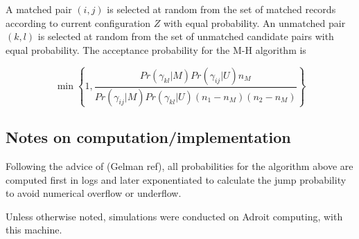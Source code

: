 \documentclass[11pt,reqno]{amsart}
\begin{document}
A matched pair $(i,j)$ is selected at random from the set of matched records according to current configuration $Z$ with equal probability.  An unmatched pair $(k,l)$ is selected at random from the set of unmatched candidate pairs with equal probability.   The acceptance probability for the M-H algorithm is

\[ \min \left\{1,  \frac{Pr(\gamma_{kl} | M)Pr(\gamma_{ij} | U) n_M}{Pr(\gamma_{ij} | M) Pr(\gamma_{kl} | U) (n_1 - n_M)(n_2 - n_M)} \right\} \]

\subsection{Notes on computation/implementation}

Following the advice of (Gelman ref), all probabilities for the algorithm above are computed first in logs and later exponentiated to calculate the jump probability to avoid numerical overflow or underflow. 

Unless otherwise noted, simulations were conducted on Adroit computing, with this machine.  
\end{document}
